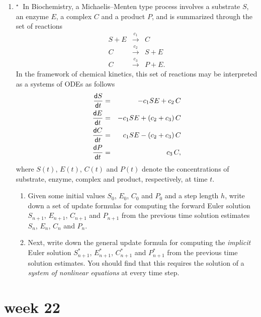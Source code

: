 \documentclass[11pt,a4paper]{article}
\newcommand{\dif}{\mathsf{d}}
\def\tough{$\!\!\!{}^\star\>$}
\begin{document}
\begin{enumerate}
\item \label{qdjsode3}\tough
In Biochemistry, a Michaelis--Menten type process involves
 a substrate $S$, an enzyme $E$, a complex $C$ and a product $P$, and is
 summarized through the set of  reactions 
 \begin{eqnarray*}
S + E &\stackrel{c_1}{\longrightarrow}& C\\
C  &\stackrel{c_2}{\longrightarrow}& S + E\\
C &\stackrel{c_3}{\longrightarrow}& P+E.
\end{eqnarray*}
In the framework of chemical kinetics, this set of reactions may be interpreted as
a systems of ODEs as follows
  \begin{eqnarray*}
{\dif S\over \dif t}   &= &  -c_1 S E  +c_2\,C\\
{\dif E\over \dif t}   &= &  -c_1 S E  + (c_2 +c_3) \,C\\
{\dif C\over \dif t}   &= &  c_1 S E  - (c_2 +c_3) \,C\\
{\dif P\over \dif t}   &= &  c_3 \,C,
\end{eqnarray*}
where  $S(t)$,   $E(t)$,  $C(t)$ and  $P(t)$ denote the concentrations of substrate,
enzyme, complex and product, respectively,  at time $t$. 

 \begin{enumerate}
\item 
Given some initial values $S_0$,   $E_0$,  $C_0$ and  $P_0$ and a step length $h$,
write down a set of update formulas for computing the forward Euler solution
 $S_{n+1}$,   $E_{n+1}$,  $C_{n+1}$ and  $P_{n+1}$   from the previous time
 solution estimates  $S_{n}$,   $E_{n}$,  $C_{n}$ and  $P_{n}$. 
 \item
 Next, write down the general update formula for computing the {\it implicit} Euler 
solution
$S^*_{n+1}$,   $E^*_{n+1}$,  $C^*_{n+1}$ and  $P^*_{n+1}$   from the previous 
time solution  estimates. You should find that this requires the solution of a 
{\it system of nonlinear equations} at every time step. 

\end{enumerate}

\end{enumerate}



\vfill\eject
\section*{week 22}
\end{document}
